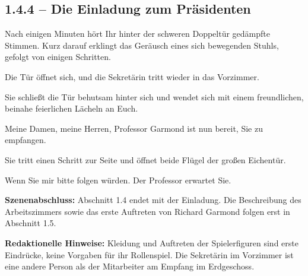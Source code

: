 \subsection{1.4.4 -- Die Einladung zum Präsidenten}
\begin{vorlesetextalle}
Nach einigen Minuten hört Ihr hinter der schweren Doppeltür gedämpfte Stimmen. Kurz darauf erklingt das Geräusch eines sich bewegenden Stuhls, gefolgt von einigen Schritten.

Die Tür öffnet sich, und die Sekretärin tritt wieder in das Vorzimmer.

Sie schlie\ss{}t die Tür behutsam hinter sich und wendet sich mit einem freundlichen, beinahe feierlichen Lächeln an Euch.

\glqq{}Meine Damen, meine Herren, Professor Garmond ist nun bereit, Sie zu empfangen.\grqq{}

Sie tritt einen Schritt zur Seite und öffnet beide Flügel der gro\ss{}en Eichentür.

\glqq{}Wenn Sie mir bitte folgen würden. Der Professor erwartet Sie.\grqq{}
\end{vorlesetextalle}

\begin{meisterinfo}
\textbf{Szenenabschluss:} Abschnitt 1.4 endet mit der Einladung. Die Beschreibung des Arbeitszimmers sowie das erste Auftreten von Richard Garmond folgen erst in Abschnitt 1.5.

\textbf{Redaktionelle Hinweise:} Kleidung und Auftreten der Spielerfiguren sind erste Eindrücke, keine Vorgaben für ihr Rollenspiel. Die Sekretärin im Vorzimmer ist eine andere Person als der Mitarbeiter am Empfang im Erdgeschoss.
\end{meisterinfo}
